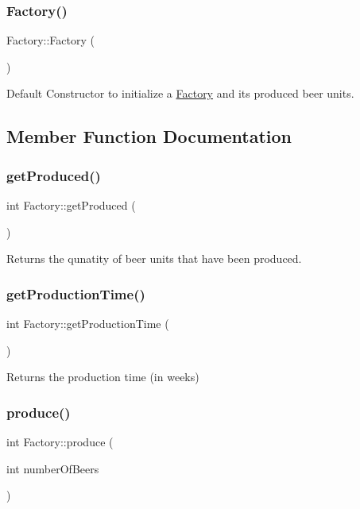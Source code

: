\subsubsection{\texorpdfstring{Factory()}{Factory()}}
{\footnotesize\ttfamily Factory\+::\+Factory (\begin{DoxyParamCaption}{ }\end{DoxyParamCaption})}

Default Constructor to initialize a \hyperlink{classFactory}{Factory} and its produced beer units. 

\subsection{Member Function Documentation}
\mbox{\label{classFactory_a6d260a0d77406fda5706fe3326d4d757}} 
\subsubsection{\texorpdfstring{get\+Produced()}{getProduced()}}
{\footnotesize\ttfamily int Factory\+::get\+Produced (\begin{DoxyParamCaption}{ }\end{DoxyParamCaption})}

Returns the qunatity of beer units that have been produced. \mbox{\label{classFactory_a45d76a893eed078b36d8d1c964142b5d}} 
\subsubsection{\texorpdfstring{get\+Production\+Time()}{getProductionTime()}}
{\footnotesize\ttfamily int Factory\+::get\+Production\+Time (\begin{DoxyParamCaption}{ }\end{DoxyParamCaption})}

Returns the production time (in weeks) \mbox{\label{classFactory_aa882efb228174be27a9f277678b22861}} 
\subsubsection{\texorpdfstring{produce()}{produce()}}
{\footnotesize\ttfamily int Factory\+::produce (\begin{DoxyParamCaption}\item[{int}]{number\+Of\+Beers }\end{DoxyParamCaption})}

